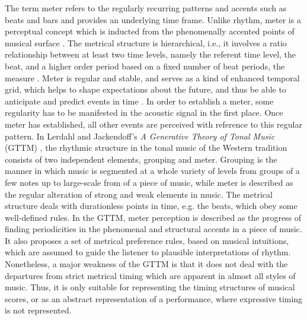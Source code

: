 \documentclass{scrartcl}
\begin{document}
The term meter refers to the regularly recurring patterns and accents such as beats and bars and provides an underlying time frame. Unlike rhythm, meter is a perceptual concept which is inducted from the phenomenally accented points of musical surface \cite{London2004}. The metrical structure is hierarchical, i.e., it involves a ratio relationship between at least two time levels, namely the referent time level, the beat, and a higher order period based on a fixed number of beat periods, the measure \cite{Yeston1976}. Meter is regular and stable, and serves as a kind of enhanced temporal grid, which helps to shape expectations about the future, and thus be able to anticipate and predict events in time \cite{Huron2006}. In order to establish a meter, some regularity has to be manifested in the acoustic signal in the first place. Once meter has established, all other events are perceived with reference to this regular pattern.  In Lerdahl and Jackendoff's \emph{A Generative Theory of Tonal Music} (GTTM) \cite{Lerdahl1985}, the rhythmic structure in the tonal music of the Western tradition consists of two independent elements, grouping and meter. Grouping is the manner in which music is segmented at a whole variety of levels from groups of a few notes up to large-scale from of a piece of music, while meter is described as the regular alteration of strong and weak elements in music. The metrical structure deals with durationless points in time, e.g. the beats, which obey some well-defined rules. In the GTTM, meter perception is described as the progress of finding periodicities in the phenomenal and structural accents in a piece of music. It also proposes a set of metrical preference rules, based on musical intuitions, which are assumed to guide the listener to plausible interpretations of rhythm. Nonetheless, a major weakness of the GTTM is that it does not deal with the departures from strict metrical timing which are apparent in almost all styles of music. Thus, it is only suitable for representing the timing structures of musical scores, or as an abstract representation of a performance, where expressive timing is not represented.



\end{document}
